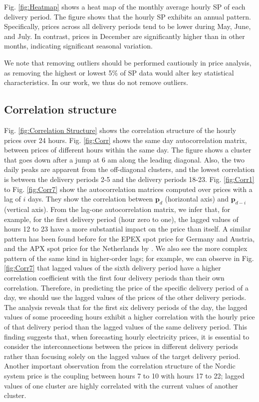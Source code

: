 \documentclass{article}
\begin{document}
Fig. \ref{fig:Heatmap} shows a heat map of the monthly average hourly SP of each delivery period. The figure shows that the hourly SP exhibits an annual pattern. Specifically, prices across all delivery periods tend to be lower during May, June, and July. In contrast, prices in December are significantly higher than in other months, indicating significant seasonal variation.

We note that removing outliers should be performed cautiously in price analysis, as removing the highest or lowest 5\% of SP data would alter key statistical characteristics. In our work, we thus do not remove outliers.

\subsection{Correlation structure}
\label{sec:correlation}
Fig. \ref{fig:Correlation Structure} shows the correlation structure of the hourly prices over 24 hours. Fig. \ref{fig:Corr} shows the same day autocorrelation matrix, between prices of different hours within the same day. The figure shows a cluster that goes down after a jump at 6 am along the leading diagonal. Also, the two daily peaks are apparent from the off-diagonal clusters, and the lowest correlation is between the delivery periods 2-5 and the delivery periods 18-23. Fig. \ref{fig:Corr1} to Fig. \ref{fig:Corr7} show the autocorrelation matrices computed over prices with a lag of $i$ days. They show the correlation between $\textbf{p}_d$ (horizontal axis) and $\textbf{p}_{d-i}$ (vertical axis). From the lag-one autocorrelation matrix, we infer that, for example, for the first delivery period (hour zero to one), the lagged values of hours 12 to 23 have a more substantial impact on the price than itself. A similar pattern has been found before for the EPEX spot price for Germany and Austria, and the APX spot price for the Netherlands by \cite{ziel2016forecasting}. We also see the more complex pattern of the same kind in higher-order lags; for example, we can observe in Fig. \ref{fig:Corr7} that lagged values of the sixth delivery period have a higher correlation coefficient with the first four delivery periods than their own correlation. Therefore, in predicting the price of the specific delivery period of a day, we should use the lagged values of the prices of the other delivery periods. The analysis reveals that for the first six delivery periods of the day, the lagged values of some proceeding hours exhibit a higher correlation with the hourly price of that delivery period than the lagged values of the same delivery period. This finding suggests that, when forecasting hourly electricity prices, it is essential to consider the interconnections between the prices in different delivery periods rather than focusing solely on the lagged values of the target delivery period. Another important observation from the correlation structure of the Nordic system price is the coupling between hours 7 to 10 with hours 17 to 22; lagged values of one cluster are highly correlated with the current values of another cluster.
\end{document}
